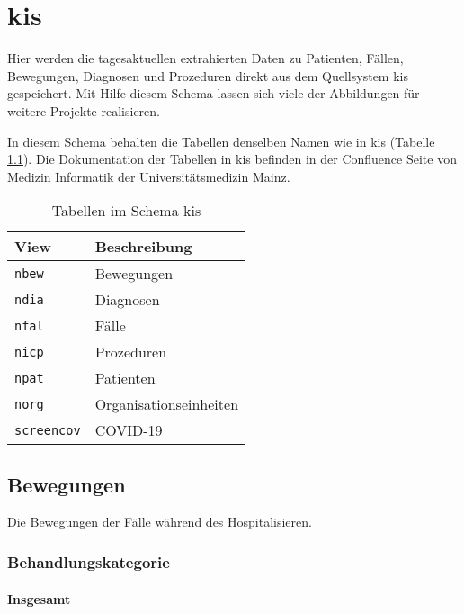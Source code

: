 \chapter{\acs{kis}} \label{chp:kis}

Hier werden die tagesaktuellen extrahierten Daten zu Patienten, Fällen, Bewegungen, Diagnosen und Prozeduren direkt aus dem Quellsystem \ac{kis} gespeichert. Mit Hilfe diesem Schema lassen sich viele der Abbildungen für weitere Projekte realisieren.

In diesem Schema behalten die Tabellen denselben Namen wie in \ac{kis} (Tabelle \ref{tab:schemaKis}). Die Dokumentation der Tabellen in \ac{kis} befinden in der Confluence Seite von Medizin Informatik der Universitätsmedizin Mainz.

\begin{table}[ht]
	\centering   
	\caption{Tabellen im Schema \acs{kis}}
	\label{tab:schemaKis}
	\begin{tabular}{||l|l||}   		
		\hline
		View & Beschreibung \\ [0.5ex]
		\hline\hline
		\texttt{nbew} & Bewegungen \\
		\hline
		\texttt{ndia} & Diagnosen \\
		\hline
		\texttt{nfal} & Fälle \\
		\hline
		\texttt{nicp} & Prozeduren \\
		\hline
		\texttt{npat} & Patienten \\
		\hline
		\texttt{norg} & Organisationseinheiten \\
		\hline
		\texttt{screencov} & COVID-19 \\
		\hline
	\end{tabular}
\end{table}

\section{Bewegungen} \label{sec:beweg}

Die Bewegungen der Fälle während des Hospitalisieren.

\subsection{Behandlungskategorie} \label{subsec:behKat}

\subsubsection{Insgesamt} \label{subsubsec:behKatI}

